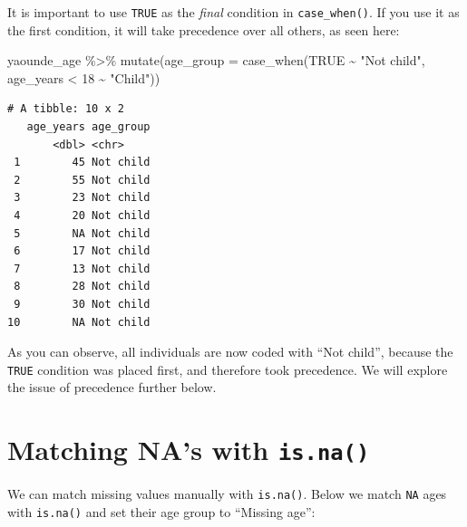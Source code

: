 \documentclass[
  letterpaper,
  DIV=11,
  numbers=noendperiod]{scrreprt}
\newenvironment{Shaded}{\begin{snugshade}}{\end{snugshade}}
\newcommand{\AttributeTok}[1]{\textcolor[rgb]{0.40,0.45,0.13}{#1}}
\newcommand{\ConstantTok}[1]{\textcolor[rgb]{0.56,0.35,0.01}{#1}}
\newcommand{\DecValTok}[1]{\textcolor[rgb]{0.68,0.00,0.00}{#1}}
\newcommand{\FunctionTok}[1]{\textcolor[rgb]{0.28,0.35,0.67}{#1}}
\newcommand{\NormalTok}[1]{\textcolor[rgb]{0.00,0.23,0.31}{#1}}
\newcommand{\SpecialCharTok}[1]{\textcolor[rgb]{0.37,0.37,0.37}{#1}}
\newcommand{\StringTok}[1]{\textcolor[rgb]{0.13,0.47,0.30}{#1}}
\begin{document}
\begin{tcolorbox}[enhanced jigsaw, titlerule=0mm, colback=white, left=2mm, breakable, opacitybacktitle=0.6, colbacktitle=quarto-callout-caution-color!10!white, colframe=quarto-callout-caution-color-frame, bottomtitle=1mm, opacityback=0, coltitle=black, arc=.35mm, toptitle=1mm, title=\textcolor{quarto-callout-caution-color}{\faFire}\hspace{0.5em}{Watch Out}, leftrule=.75mm, toprule=.15mm, bottomrule=.15mm, rightrule=.15mm]

It is important to use \texttt{TRUE} as the \emph{final} condition in
\texttt{case\_when()}. If you use it as the first condition, it will
take precedence over all others, as seen here:

\begin{Shaded}
\begin{Highlighting}[]
\NormalTok{yaounde\_age }\SpecialCharTok{\%\textgreater{}\%}
  \FunctionTok{mutate}\NormalTok{(}\AttributeTok{age\_group =} \FunctionTok{case\_when}\NormalTok{(}\ConstantTok{TRUE} \SpecialCharTok{\textasciitilde{}} \StringTok{"Not child"}\NormalTok{,}
\NormalTok{                               age\_years }\SpecialCharTok{\textless{}} \DecValTok{18} \SpecialCharTok{\textasciitilde{}} \StringTok{"Child"}\NormalTok{))}
\end{Highlighting}
\end{Shaded}

\begin{verbatim}
# A tibble: 10 x 2
   age_years age_group
       <dbl> <chr>    
 1        45 Not child
 2        55 Not child
 3        23 Not child
 4        20 Not child
 5        NA Not child
 6        17 Not child
 7        13 Not child
 8        28 Not child
 9        30 Not child
10        NA Not child
\end{verbatim}

As you can observe, all individuals are now coded with ``Not child'',
because the \texttt{TRUE} condition was placed first, and therefore took
precedence. We will explore the issue of precedence further below.

\end{tcolorbox}

\section{\texorpdfstring{Matching NA's with
\texttt{is.na()}}{Matching NA's with is.na()}}\label{matching-nas-with-is.na}

We can match missing values manually with \texttt{is.na()}. Below we
match \texttt{NA} ages with \texttt{is.na()} and set their age group to
``Missing age'':
\end{document}
